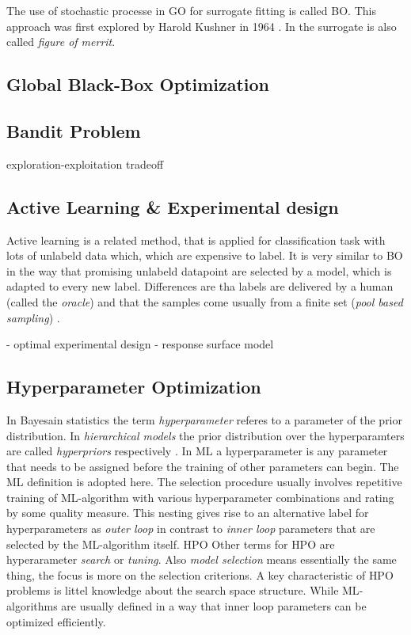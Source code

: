 \documentclass[english]{article}
\begin{document}
The use of stochastic processe in \ac{GO} for surrogate fitting is called \ac{BO}. This approach was first explored by Harold Kushner in 1964 \cite{kushner_new_1964}. In \cite{jones_efficient_1998} the surrogate is also called \textit{figure of merrit}.


\subsection{Global Black-Box Optimization}



\subsection{Bandit Problem}
exploration-exploitation tradeoff


\subsection{Active Learning \& Experimental design}
Active learning is a related method, that is applied for classification task with lots of unlabeld data which, which are expensive to label. It is very similar to BO in the way that promising unlabeld datapoint are selected by a model, which is adapted to every new label. Differences are tha labels are delivered by a human (called the \textit{oracle}) and that the samples come usually from a finite set (\textit{pool based sampling}) \cite{settles_active_2010}.

 - optimal experimental design
 - response surface model

\subsection{Hyperparameter Optimization}
In Bayesain statistics the term \textit{hyperparameter} referes to a parameter of the prior distribution. In \textit{hierarchical models} the prior distribution over the hyperparamters are called \textit{hyperpriors} respectively \cite[p.408]{bishop_neural_1995}. In \acf{ML} a hyperparameter is any parameter that needs to be assigned before the training of other parameters can begin. The \ac{ML} definition is adopted here. The selection procedure usually involves repetitive training of \ac{ML}-algorithm with various hyperparameter combinations and rating by some quality measure. This nesting gives rise to an alternative label for hyperparameters as \textit{outer loop} in contrast to \textit{inner loop} parameters that are selected by the \ac{ML}-algorithm itself. \acf{HPO} Other terms for \ac{HPO} are hyperarameter \textit{search} or \textit{tuning}.
Also \textit{model selection} means essentially the same thing, the focus is more on the selection criterions.
A key characteristic of \ac{HPO} problems is littel knowledge about the search space structure.  While \ac{ML}-algorithms are usually defined in a way that inner loop parameters can be optimized efficiently.
\end{document}
